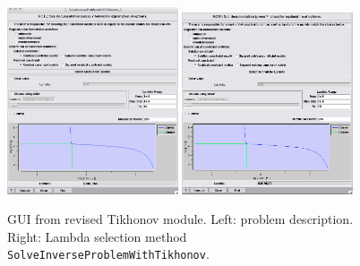     \begin{figure}
    \begin{center}
    \includegraphics[width=0.45\textwidth]{ECGToolkitGuide_figures/tik2.png}
    \includegraphics[width=0.45\textwidth]{ECGToolkitGuide_figures/tik3.png}
    \caption{GUI from revised Tikhonov module. Left: problem description. Right: Lambda selection method {\tt SolveInverseProblemWithTikhonov}.}
    \label{fig:tik_module_gui}
    \end{center}
    \end{figure}

    
